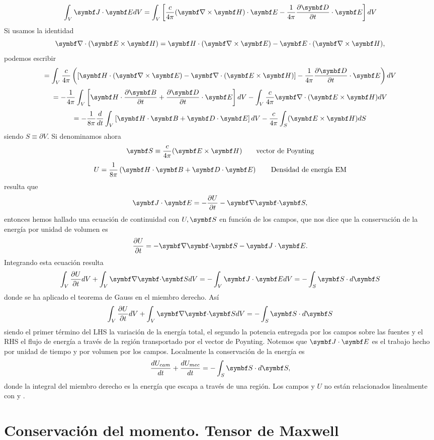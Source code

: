 \documentclass[10pt,oneside]{CBFT_book}
\begin{document}
\[
	\int_V \vb{J}\cdot \vb{E} dV = \int_V \left[ \frac{c}{4\pi}(\rotorm{H})\cdot\vb{E} - 
		\frac{1}{4\pi}\dpar{\vb{D}}{t}\cdot\vb{E} \right] dV
\]
Si usamos la identidad
\[
	\Nabla\cdot(\pv{E}{H}) = \vb{H}\cdot(\rotorm{E}) - \vb{E}\cdot(\rotorm{H}),
\]
podemos escribir
\[
	= \int_V \frac{c}{4\pi} \left( \left[ \vb{H}\cdot(\rotorm{E}) - \Nabla\cdot(\pv{E}{H}) \right] - 
		\frac{1}{4\pi}\dpar{\vb{D}}{t}\cdot\vb{E}  \right) dV
\]
\[
	= - \frac{1}{4\pi}\int_V \left[ \vb{H}\cdot\dpar{\vb{B}}{t} + \dpar{\vb{D}}{t}\cdot\vb{E} \right] dV - 
		\int_V \frac{c}{4\pi}  \Nabla\cdot(\pv{E}{H}) dV
\]
\[
	= - \frac{1}{8\pi}\frac{d}{dt} \int_V \left[ \vb{H}\cdot\vb{B} + \vb{D}\cdot\vb{E} \right] dV - 
		 \frac{c}{4\pi} \int_S (\pv{E}{H}) dS
\]
siendo $S\equiv\partial V$. Si denominamos ahora
\[
	\vb{S} \equiv \frac{c}{4\pi}(\pv{E}{H}) \qquad \text{vector de Poynting}
\]
\[
	U = \frac{1}{8\pi}\left( \vb{H}\cdot\vb{B} + \vb{D}\cdot\vb{E} \right) \qquad \text{Densidad de energía EM}
\]
resulta que 
\[
	\pe{J}{E} = -\dpar{U}{t} - \divem{S},
\]
entonces hemos hallado una ecuación de continuidad con $U, \vb{S}$ en función de los campos, que nos
dice que la conservación de la energía por unidad de volumen es
\[
	\dpar{U}{t} = -\divem{S} -\pe{J}{E}.
\]
Integrando esta ecuación resulta
\[
	\int_V \dpar{U}{t} dV + \int_V \divem{S} dV = - \int_V \pe{J}{E} dV = -\int_S \vb{S}\cdot d\vb{S}
\]
donde se ha aplicado el teorema de Gauss en el miembro derecho.
Así
\[
	\int_V \dpar{U}{t} dV + \int_V \divem{S} dV = -\int_S \vb{S}\cdot d\vb{S}
\]
siendo el primer término del LHS la variación de la energía total, el segundo la potencia entregada por
los campos sobre las fuentes y el RHS el flujo de energía a través de la región transportado por el
vector de Poynting.
Notemos que $\pe{J}{E}$ es el trabajo hecho por unidad de tiempo y por volumen por los campos.
Localmente la conservación de la energía es
\[
	\dtot{U_{cam}}{t} + \dtot{U_{mec}}{t} = -\int_S \vb{S}\cdot d\vb{S},
\]
donde la integral del miembro derecho es la energía que escapa a través de una región.
Los campos  y $U$ no están relacionados linealmente con  y .

\section{Conservación del momento. Tensor de Maxwell}
\end{document}
